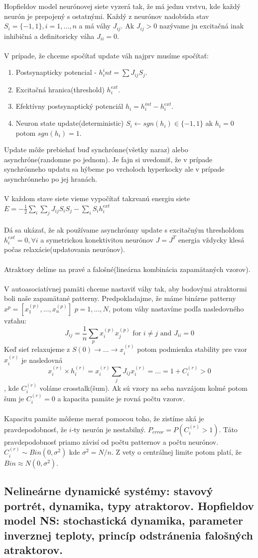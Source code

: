 \documentclass{article}
\numberwithin{equation}{section} %
\begin{document}
Hopfieldov model neurónovej siete vyzerá tak, že má jednu vrstvu, kde každý neurón je prepojený s ostatnými. Každý z neurónov nadobúda stav $S_i = \{-1,1\}, i = 1,\dots, n$ a má váhy $J_{ij}$. Ak $J_{ij} > 0$ nazývame ju excitačná inak inhibičná a definitoricky váha $J_{ii} = 0$. \\\\
V prípade, že chceme spočítať update váh najprv musíme spočítať:
\begin{enumerate}
\item Postsynapticky potencial - $h_i^int = \sum J_{ij}S_j$.
\item Excitačná hranica(threshold) $h_i^{ext}$.
\item Efektívny postsynaptický potenciál $h_i = h_i^{int} - h_i^{ext}$.
\item Neuron state update(deterministic) $S_i \leftarrow sgn(h_i) \in \{-1,1\}$ ak $h_i=0$ potom $sgn(h_i) = 1$.
\end{enumerate}
Update môže prebiehať buď synchrónne(všetky naraz) alebo asynchróne(randomne po jednom). Je fajn si uvedomiť, že v prípade synchrónneho updatu sa hýbeme po vrcholoch hyperkocky ale v prípade asynchrónneho po jej hranách.
\\\\
 V každom stave siete vieme vypočítať takzvanú energiu siete $E = -\frac{1}{2}\sum_i\sum_jJ_{ij}S_iS_j - \sum_iS_ih_i^{ext}$
\\\\
Dá sa ukázať, že ak používame asynchrónny update s excitačným thresholdom $h_i^{ext} = 0, \forall i$ a symetrickou konektivitou neurónov $J = J^T$ energia vždycky klesá počas relaxácie(updatovania neurónov). 
\\\\
Atraktory delíme na pravé a falošné(lineárna kombinácia zapamätaných vzorov). 
\\\\
V autoasociatívnej pamäti chceme nastaviť váhy tak, aby bodovými atraktormi boli naše zapamätané patterny.
Predpokladajme, že máme binárne patterny $x^p = [x_1^{(p)}, \dots, x_n^{(p)}]$ $p = 1, \dots, N$, potom váhy nastavíme podľa nasledovného vzťahu: 
$$ J_{ij} = \frac{1}{n}\sum_p x_i^{(p)} x_j^{(p)} \text{ for } i\neq j \text{ and } J_{ii} = 0$$
Keď sieť relaxujeme z $S(0) \to \dots \to x_i^{(r)}$ potom podmienka stability  pre vzor $x_i^{(r)}$ je nasledovná 
$$x_i^{(r)}\times h_i^{(r)} = x_i^{(r)}\sum_jJ_{ij}x_i^{(r)} = \dots = 1 + C_i^{(r)} > 0$$, 
kde $C_i^{(r)}$ voláme crosstalk(šum). Ak sú vzory na seba navzájom kolmé potom šum je $C_i^{(r)} = 0$ a kapacita pamäte je rovná počtu vzorov.
\\\\
Kapacitu pamäte môžeme merať pomocou toho, že zistíme aká je pravdepodobnosť, že $i$-ty neurón je nestabilný. $P_{error} = P(C_i^{(r)} > 1)$. Táto pravdepodobnosť priamo závisí od počtu patternov a počtu neurónov. $C_i^{(r)} \sim Bin(0,\sigma^2)$ kde $\sigma^2 = N/n$. Z vety o centrálnej limite potom platí, že $Bin\approx N(0, \sigma^2)$.


\subsection{Nelineárne dynamické systémy: stavový portrét, dynamika, typy atraktorov. Hopfieldov model NS: stochastická dynamika, parameter inverznej teploty, princíp odstránenia falošných atraktorov.}
\end{document}
